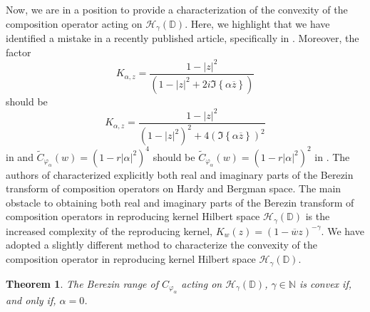 \documentclass[12pt, reqno]{amsart}
\newtheorem{theorem}{Theorem}[section]
\theoremstyle{definition}
\theoremstyle{remark}
\numberwithin{equation}{section}
\begin{document}
Now, we are in a position to provide a characterization of the convexity of the composition operator acting on $\mathcal{H}_\gamma(\mathbb{D})$. Here, we highlight that we have identified a mistake in a recently published article, specifically in \cite[Lemma 5.4 and Theorem 5.7]{Augustine_Garayev_Shankar_CAOT_2023}. Moreover, the factor $$K_{\alpha,z}=\dfrac{1-|z|^2}{(1-|z|^2+2i\Im\left\{\alpha\overline{z}\right\})}$$ should be $$K_{\alpha,z}=\dfrac{1-|z|^2}{\left(1-|z|^2\right)^2+4\left(\Im\left\{\alpha\overline{z}\right\}\right)^2}$$ in \cite[Lemma 5.4]{Augustine_Garayev_Shankar_CAOT_2023} and $\widetilde{C}_{\varphi_\alpha}(w)=\left(1-r|\alpha|^2\right)^4$ should be $\widetilde{C}_{\varphi_\alpha}(w)=\left(1-r|\alpha|^2\right)^2$ in \cite[Theorem 5.7]{Augustine_Garayev_Shankar_CAOT_2023}.
The authors of \cite{CowenFelder, Augustine_Garayev_Shankar_CAOT_2023} characterized explicitly both real and imaginary parts of the Berezin transform of composition operators on Hardy and Bergman space.  
The main obstacle to obtaining both real and imaginary parts of the Berezin transform of composition operators in reproducing kernel Hilbert space $\mathcal{H}_\gamma(\mathbb{D})$ is the increased complexity of the reproducing kernel, $ K_w(z)=(1-\overline{w}z)^{-\gamma}.$ We have adopted a slightly different method to characterize the convexity of the composition operator in reproducing kernel Hilbert space $\mathcal{H}_\gamma(\mathbb{D})$. 


\begin{theorem}\label{th:value_of_alpha}
         The Berezin range of $C_{\varphi_\alpha}$ acting on $\mathcal{H}_\gamma(\mathbb{D})$, $\gamma\in \mathbb{N}$ is convex if, and only if, $\alpha=0$.
     \end{theorem}
\end{document}
